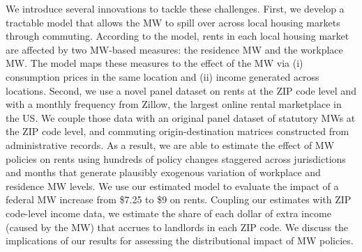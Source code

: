 We introduce several innovations to tackle these challenges.
First, we develop a tractable model that allows the MW to spill over 
across local housing markets through commuting.
According to the model, rents in each local housing market are affected by 
two MW-based measures:
the residence MW and the workplace MW.
The model maps these measures to the effect of the MW via 
(i) consumption prices in the same location and
(ii) income generated across locations.
Second, we use a novel panel dataset on rents at the ZIP code level and with 
a monthly frequency from Zillow, the largest online rental marketplace in the US.
We couple those data with an original panel dataset of statutory MWs 
at the ZIP code level, and commuting origin-destination matrices constructed
from administrative records.
As a result, we are able to estimate the effect of MW policies on rents using 
hundreds of policy changes staggered across jurisdictions and months that 
generate plausibly exogenous variation of workplace and residence MW levels.
We use our estimated model to evaluate the impact of a federal MW increase 
from \$7.25 to \$9 on rents.
Coupling our estimates with ZIP code-level income data, we estimate the share of 
each dollar of extra income (caused by the MW) that accrues to landlords in each 
ZIP code.
We discuss the implications of our results for assessing the distributional 
impact of MW policies.


